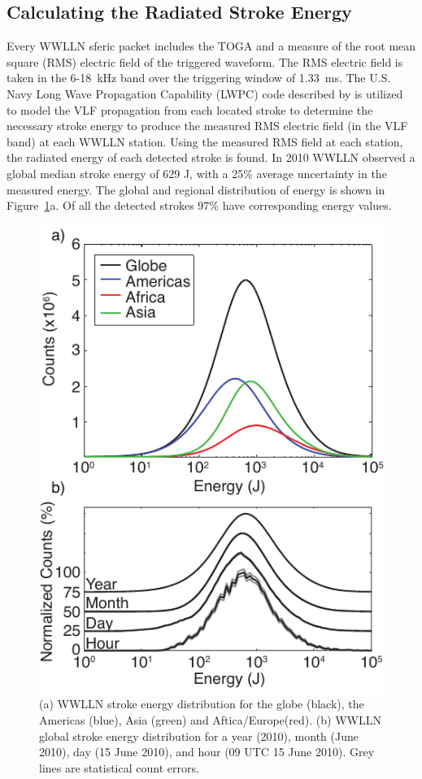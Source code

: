 \subsection{Calculating the Radiated Stroke Energy}

Every WWLLN sferic packet includes the TOGA and a measure of the root mean square (RMS) electric field of the triggered waveform.
The RMS electric field is taken in the 6-18~kHz band over the triggering window of 1.33~ms.
The U.S. Navy Long Wave Propagation Capability (LWPC) code described by \citet{Ferguson1998} is utilized to model the VLF propagation from each located stroke to determine the necessary stroke energy to produce the measured RMS electric field (in the VLF band) at each WWLLN station.
Using the measured RMS field at each station, the radiated energy of each detected stroke is found.
In 2010 WWLLN observed a global median stroke energy of 629 J, with a 25\% average uncertainty in the measured energy.
The global and regional distribution of energy is shown in Figure~\ref{efficiency:fig:2010_Energy}a.
Of all the detected strokes 97\% have corresponding energy values.
\citep{Hutchins2012}

\begin{figure}[ht!]
   \centering
\noindent\includegraphics[scale=1]{efficiency/Figures/2012RS005049-p1.pdf}
   \caption{(a) WWLLN stroke energy distribution for the globe (black), the Americas (blue), Asia (green) and Aftica/Europe(red).
(b) WWLLN global stroke energy distribution for a year (2010), month (June 2010), day (15 June 2010), and hour (09 UTC 15 June 2010).
Grey lines are statistical count errors.}
   \label{efficiency:fig:2010_Energy}
\end{figure}

